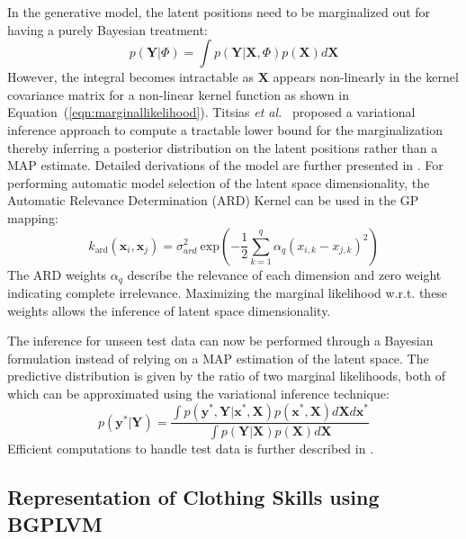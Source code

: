 \documentclass{article}
\begin{document}
In the generative model, the latent positions need to be marginalized out for having a purely Bayesian treatment:
\begin{equation}
  \label{eqn:marginalization}
  p(\mathbf{Y}|\Phi) = \int p(\mathbf{Y}|\mathbf{X},\Phi) p(\mathbf{X}) d\mathbf{X}
\end{equation}
However, the integral becomes intractable as $\mathbf{X}$ appears non-linearly in the kernel covariance matrix for a non-linear kernel function as shown in Equation~(\ref{eqn:marginallikelihood}). Titsias \emph{et al.}~\cite{bgplvm} proposed a variational inference approach to compute a tractable lower bound for the marginalization thereby inferring a posterior distribution on the latent positions rather than a MAP estimate. Detailed derivations of the model are further presented in \cite{bgplvm}. For performing automatic model selection of the latent space dimensionality, the Automatic Relevance Determination (ARD) Kernel can be used in the GP mapping:
\begin{equation}
  \label{eqn:ardkernel}
  k_{\text{ard}}(\mathbf{x}_i,\mathbf{x}_j) = \sigma_{ard}^2~\text{exp}\left( - \frac{1}{2} \sum_{k=1}^q{\alpha_q (x_{i,k} - x_{j,k})^2}\right)
\end{equation}
The ARD weights $\alpha_q$ describe the relevance of each dimension and zero weight indicating complete irrelevance. Maximizing the marginal likelihood w.r.t. these weights allows the inference of latent space dimensionality.

The inference for unseen test data can now be performed through a Bayesian formulation instead of relying on a MAP estimation of the latent space. The predictive distribution is given by the ratio of two marginal likelihoods, both of which can be approximated using the variational inference technique:
\begin{equation}
	\label{eqn:testinference}
	p(\mathbf{y}^*|\mathbf{Y}) = \frac{\int p(\mathbf{y}^*,\mathbf{Y}|\mathbf{x}^*,\mathbf{X})p(\mathbf{x}^*,\mathbf{X})d\mathbf{X}d\mathbf{x}^*}{\int p(\mathbf{Y}|\mathbf{X})p(\mathbf{X})d\mathbf{X}}
\end{equation}
Efficient computations to handle test data is further described in \cite{bgplvm}.

\subsection{Representation of Clothing Skills using BGPLVM}
\label{section:clothassist}
\end{document}
